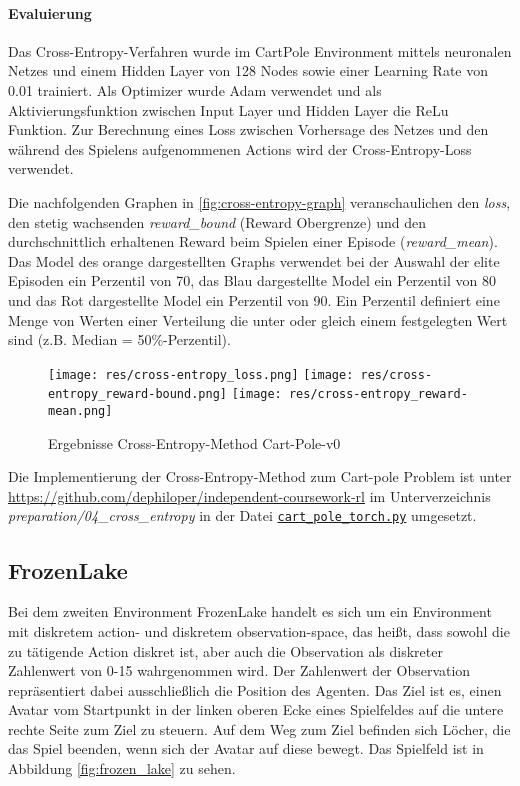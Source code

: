 \documentclass[11pt]{scrartcl}
\begin{document}
\paragraph*{Evaluierung}
\noindent
\newline
Das Cross-Entropy-Verfahren wurde im CartPole Environment mittels neuronalen Netzes und
einem Hidden Layer von 128 Nodes sowie einer Learning Rate von 0.01 trainiert. Als
Optimizer wurde Adam verwendet und als Aktivierungsfunktion zwischen Input Layer und
Hidden Layer die ReLu Funktion. Zur Berechnung eines Loss zwischen Vorhersage des Netzes
und den während des Spielens aufgenommenen Actions wird der Cross-Entropy-Loss verwendet.

Die nachfolgenden Graphen in \autoref{fig:cross-entropy-graph} veranschaulichen den
\textit{loss}, den stetig wachsenden \textit{reward\_bound} (Reward Obergrenze) und den
durchschnittlich erhaltenen Reward beim Spielen einer Episode (\textit{reward\_mean}).
Das Model des orange dargestellten Graphs verwendet bei der Auswahl der elite Episoden
ein Perzentil von 70, das Blau dargestellte Model ein Perzentil von 80 und das Rot
dargestellte Model ein Perzentil von 90. Ein Perzentil definiert eine Menge von Werten
einer Verteilung die unter oder gleich einem festgelegten Wert sind (z.B. Median =
50\%-Perzentil).

\begin{figure}[htp]
\centering
\texttt{[image: res/cross-entropy\_loss.png]}
\texttt{[image: res/cross-entropy\_reward-bound.png]}
\texttt{[image: res/cross-entropy\_reward-mean.png]}
\caption{Ergebnisse Cross-Entropy-Method Cart-Pole-v0}
\label{fig:cross-entropy-graph}
\end{figure}

Die Implementierung der Cross-Entropy-Method zum Cart-pole Problem ist unter
\url{https://github.com/dephiloper/independent-coursework-rl} im Unterverzeichnis 
\textit{preparation/04\_cross\_entropy} in der Datei
\href{https://github.com/dephiloper/independent-coursework-rl/blob/master/preparation/04_cross_entropy/cart_pole_torch.py}{\nolinkurl{cart\_pole\_torch.py}} umgesetzt.


\subsection{FrozenLake}
\label{sec:frozen-lake}
Bei dem zweiten Environment FrozenLake handelt es sich um ein Environment mit diskretem action-
und diskretem observation-space, das heißt, dass sowohl die zu tätigende Action diskret ist,
aber auch die Observation als diskreter Zahlenwert von 0-15 wahrgenommen wird. Der Zahlenwert
der Observation repräsentiert dabei ausschließlich die Position des Agenten. Das Ziel ist es,
einen Avatar vom Startpunkt in der linken oberen Ecke eines Spielfeldes auf die untere rechte
Seite zum Ziel zu steuern. Auf dem Weg zum Ziel befinden sich Löcher, die das Spiel beenden, wenn
sich der Avatar auf diese bewegt. Das Spielfeld ist in Abbildung \ref{fig:frozen_lake} zu sehen.
\end{document}
